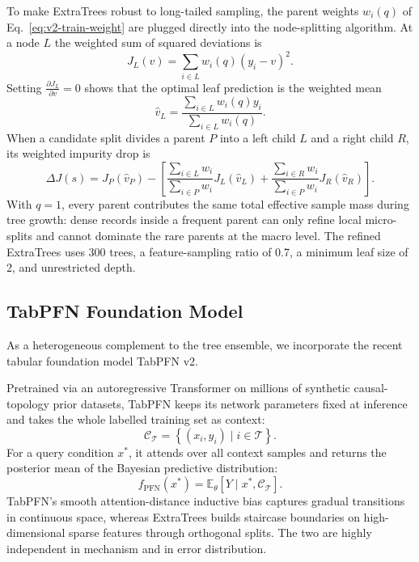 To make ExtraTrees robust to long-tailed sampling, the parent weights $w_i(q)$ of Eq.~\eqref{eq:v2-train-weight} are plugged directly into the node-splitting algorithm. At a node $L$ the weighted sum of squared deviations is
\begin{equation}
J_L(v) = \sum_{i \in L} w_i(q) (y_i - v)^2.
\end{equation}
Setting $\frac{\partial J_L}{\partial v} = 0$ shows that the optimal leaf prediction is the weighted mean
\begin{equation}
\widehat v_L = \frac{\sum_{i \in L} w_i(q) y_i}{\sum_{i \in L} w_i(q)}.
\end{equation}
When a candidate split divides a parent $P$ into a left child $L$ and a right child $R$, its weighted impurity drop is
\begin{equation}
\Delta J(s) = J_P(\widehat v_P) - \left[ \frac{\sum_{i \in L} w_i}{\sum_{i \in P} w_i} J_L(\widehat v_L) + \frac{\sum_{i \in R} w_i}{\sum_{i \in P} w_i} J_R(\widehat v_R) \right].
\end{equation}
With $q=1$, every parent contributes the same total effective sample mass during tree growth: dense records inside a frequent parent can only refine local micro-splits and cannot dominate the rare parents at the macro level. The refined ExtraTrees uses 300 trees, a feature-sampling ratio of 0.7, a minimum leaf size of 2, and unrestricted depth.

\subsection{TabPFN Foundation Model}

As a heterogeneous complement to the tree ensemble, we incorporate the recent tabular foundation model TabPFN v2\cite{tabpfn2025}.

Pretrained via an autoregressive Transformer on millions of synthetic causal-topology prior datasets, TabPFN keeps its network parameters fixed at inference and takes the whole labelled training set as context:
\begin{equation}
\mathcal{C}_{\mathcal{T}} = \left\{ (x_i, y_i) \mid i \in \mathcal{T} \right\}.
\end{equation}
For a query condition $x^*$, it attends over all context samples and returns the posterior mean of the Bayesian predictive distribution:
\begin{equation}
f_{\mathrm{PFN}}(x^*) = \mathbb{E}_{\theta}\left[ Y \mid x^*, \mathcal{C}_{\mathcal{T}} \right].
\end{equation}
TabPFN's smooth attention-distance inductive bias captures gradual transitions in continuous space, whereas ExtraTrees builds staircase boundaries on high-dimensional sparse features through orthogonal splits. The two are highly independent in mechanism and in error distribution.

